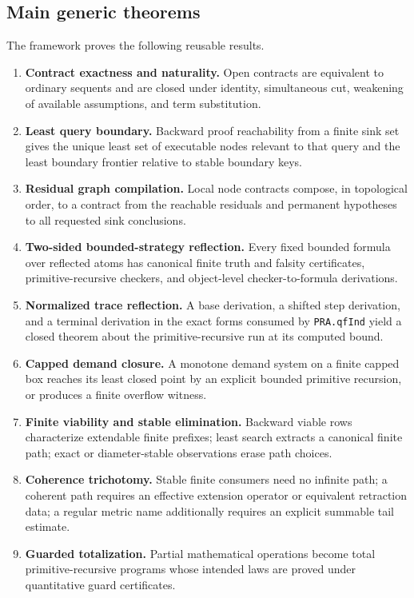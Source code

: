 \subsection{Main generic theorems}

The framework proves the following reusable results.
\begin{enumerate}[label=\textbf{T\arabic*.},leftmargin=4.1em]
  \item \textbf{Contract exactness and naturality.}  Open contracts are equivalent to ordinary sequents and are closed under identity, simultaneous cut, weakening of available assumptions, and term substitution.
  \item \textbf{Least query boundary.}  Backward proof reachability from a finite sink set gives the unique least set of executable nodes relevant to that query and the least boundary frontier relative to stable boundary keys.
  \item \textbf{Residual graph compilation.}  Local node contracts compose, in topological order, to a contract from the reachable residuals and permanent hypotheses to all requested sink conclusions.
  \item \textbf{Two-sided bounded-strategy reflection.}  Every fixed bounded formula over reflected atoms has canonical finite truth and falsity certificates, primitive-recursive checkers, and object-level checker-to-formula derivations.
  \item \textbf{Normalized trace reflection.}  A base derivation, a shifted step derivation, and a terminal derivation in the exact forms consumed by \texttt{PRA.qfInd} yield a closed theorem about the primitive-recursive run at its computed bound.
  \item \textbf{Capped demand closure.}  A monotone demand system on a finite capped box reaches its least closed point by an explicit bounded primitive recursion, or produces a finite overflow witness.
  \item \textbf{Finite viability and stable elimination.}  Backward viable rows characterize extendable finite prefixes; least search extracts a canonical finite path; exact or diameter-stable observations erase path choices.
  \item \textbf{Coherence trichotomy.}  Stable finite consumers need no infinite path; a coherent path requires an effective extension operator or equivalent retraction data; a regular metric name additionally requires an explicit summable tail estimate.
  \item \textbf{Guarded totalization.}  Partial mathematical operations become total primitive-recursive programs whose intended laws are proved under quantitative guard certificates.
\end{enumerate}

